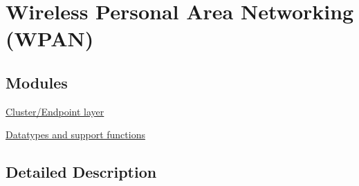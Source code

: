 \hypertarget{group__wpan}{\section{Wireless Personal Area Networking (W\-P\-A\-N)}
\label{group__wpan}
}
\subsection*{Modules}
\begin{DoxyCompactItemize}
\item 
\hyperlink{group__wpan__aps}{Cluster/\-Endpoint layer}
\item 
\hyperlink{group__wpan__types}{Datatypes and support functions}
\end{DoxyCompactItemize}


\subsection{Detailed Description}
